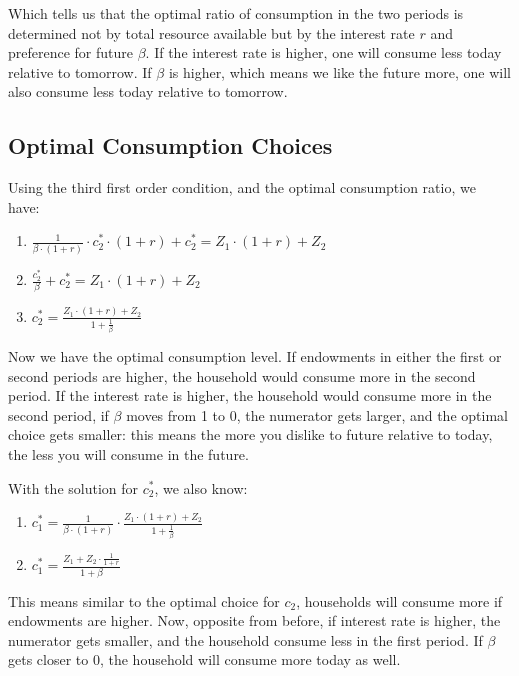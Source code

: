 \documentclass[
]{book}
\begin{document}
Which tells us that the optimal ratio of consumption in the two periods
is determined not by total resource available but by the interest rate
\(r\) and preference for future \(\beta\). If the interest rate is higher,
one will consume less today relative to tomorrow. If \(\beta\) is higher,
which means we like the future more, one will also consume less today
relative to tomorrow.

\hypertarget{optimal-consumption-choices}{%
\subsection{Optimal Consumption Choices}\label{optimal-consumption-choices}}

Using the third first order condition, and the optimal consumption
ratio, we have:

\begin{enumerate}
\def\labelenumi{\arabic{enumi}.}
\item
  \(\displaystyle \frac{1}{\beta \cdot (1+r)}\cdot c_2^{\ast } \cdot (1+r)+c_2^{\ast } =Z_1 \cdot (1+r)+Z_2\)
\item
  \(\displaystyle \frac{c_2^{\ast } }{\beta }+c_2^{\ast } =Z_1 \cdot (1+r)+Z_2\)
\item
  \(\displaystyle c_2^{\ast } =\frac{Z_1 \cdot (1+r)+Z_2 }{1+\frac{1}{\beta }}\)
\end{enumerate}

Now we have the optimal consumption level. If endowments in either the
first or second periods are higher, the household would consume more in
the second period. If the interest rate is higher, the household would
consume more in the second period, if \(\beta\) moves from 1 to 0, the
numerator gets larger, and the optimal choice gets smaller: this means
the more you dislike to future relative to today, the less you will
consume in the future.

With the solution for \(c_2^{\ast }\), we also know:

\begin{enumerate}
\def\labelenumi{\arabic{enumi}.}
\item
  \(\displaystyle c_1^{\ast } =\frac{1}{\beta \cdot (1+r)}\cdot \frac{Z_1 \cdot (1+r)+Z_2 }{1+\frac{1}{\beta }}\)
\item
  \(\displaystyle c_1^{\ast } =\frac{Z_1 +Z_2 \cdot \frac{1}{1+r}}{1+\beta }\)
\end{enumerate}

This means similar to the optimal choice for \(c_2\), households will
consume more if endowments are higher. Now, opposite from before, if
interest rate is higher, the numerator gets smaller, and the household
consume less in the first period. If \(\beta\) gets closer to 0, the
household will consume more today as well.
\end{document}

